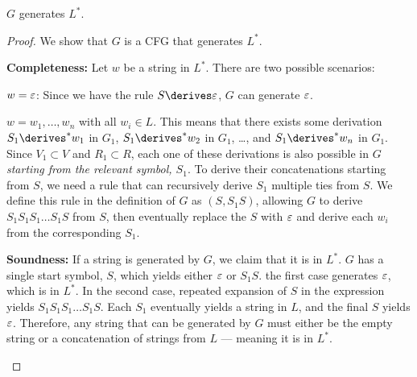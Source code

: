 \begin{problem}
\begin{enumalph}
\begin{Answer}
      \begin{claim}
        $G$ generates $L^*$.

        \begin{proof}
          We show that $G$ is a CFG that generates $L^*$.
          \begin{enumroman}
            \item \textbf{Completeness:}
              Let $w$ be a string in $L^*$.
              There are two possible scenarios:
              \begin{enumroman}
                \item $w = \varepsilon$: Since we have the rule $S \derives \eps$,
                  $G$ can generate $\varepsilon$.
                \item $w = w_1, \ldots, w_n$ with all $w_i \in L$.
                  This means that there exists some derivation $S_1 \derives^* w_1$ in $G_1$,
                  $S_1 \derives^* w_2$ in $G_1$, \ldots, and $S_1 \derives^* w_n$ in $G_1$.
                  Since $V_1 \subset V$ and $R_1 \subset R$,
                  each one of these derivations is also possible in $G$
                  \emph{starting from the relevant symbol, $S_1$}.
                  To derive their concatenations starting from $S$,
                  we need a rule that can recursively derive $S_1$
                  multiple ties from $S$.
                  We define this rule in the definition of $G$ as $(S, S_1S)$,
                  allowing $G$ to derive $S_1S_1S_1 \ldots S_1S$ from $S$,
                  then eventually replace the $S$ with $\varepsilon$
                  and derive each $w_i$ from the corresponding $S_1$.
              \end{enumroman}
            \item \textbf{Soundness:}
              If a string is generated by $G$, we claim that it is in $L^*$.
              $G$ has a single start symbol, $S$,
              which yields either $\varepsilon$ or $S_1S$.
              the first case generates $\varepsilon$, which is in $L^*$.
              In the second case, repeated expansion of $S$ in the expression
              yields $S_1S_1S_1 \ldots S_1S$.
              Each $S_1$ eventually yields a string in $L$,
              and the final $S$ yields $\varepsilon$.
              Therefore, any string that can be generated by $G$ must either be
              the empty string or a concatenation of strings from $L$ ---
              meaning it is in $L^*$.
          \end{enumroman}
        \end{proof}
      \end{claim}
    \end{Answer}
  \end{enumalph}
\end{problem}
